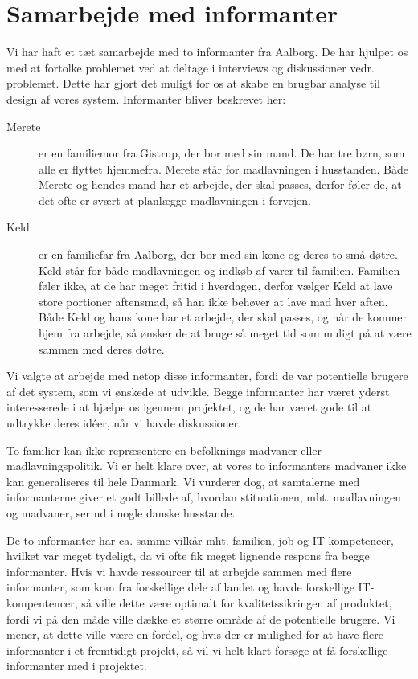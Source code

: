 \chapter{Samarbejde med informanter}
\label{akademiskinformanter}



Vi har haft et tæt samarbejde med to informanter fra Aalborg. De har hjulpet os med at fortolke problemet ved at deltage i interviews og diskussioner vedr. problemet. Dette har gjort det muligt for os at skabe en brugbar analyse til design af vores system. Informanter bliver beskrevet her:

\begin{description}
\item[Merete] er en familiemor fra Gistrup, der bor med sin mand. De har tre børn, som alle er flyttet hjemmefra. Merete står for madlavningen i husstanden. Både Merete og hendes mand har et arbejde, der skal passes, derfor føler de, at det ofte er svært at planlægge madlavningen i forvejen.

\item[Keld] er en familiefar fra Aalborg, der bor med sin kone og deres to små døtre. Keld står for både madlavningen og indkøb af varer til familien. Familien føler ikke, at de har meget fritid i hverdagen, derfor vælger Keld at lave store portioner aftensmad, så han ikke behøver at lave mad hver aften. Både Keld og hans kone har et arbejde, der skal passes, og når de kommer hjem fra arbejde, så ønsker de at bruge så meget tid som muligt på at være sammen med deres døtre.
\end{description}

Vi valgte at arbejde med netop disse informanter, fordi de var potentielle brugere af det system, som vi ønskede at udvikle. Begge informanter har været yderst interesserede i at hjælpe os igennem projektet, og de har været gode til at udtrykke deres idéer, når vi havde diskussioner.

To familier kan ikke repræsentere en befolknings madvaner eller madlavningspolitik. Vi er helt klare over, at vores to informanters madvaner ikke kan generaliseres til hele Danmark. Vi vurderer dog, at samtalerne med informanterne giver et godt billede af, hvordan stituationen, mht. madlavningen og madvaner, ser ud i nogle danske husstande. 

De to informanter har ca. samme vilkår mht. familien, job og IT-kompetencer, hvilket var meget tydeligt, da vi ofte fik meget lignende respons fra begge informanter. Hvis vi havde ressourcer til at arbejde sammen med flere informanter, som \fx kom fra forskellige dele af landet og havde forskellige IT-kompentencer, så ville dette være optimalt for kvalitetssikringen af produktet, fordi vi på den måde ville dække et større område af de potentielle brugere. Vi mener, at dette ville være en fordel, og hvis der er mulighed for at have flere informanter i et fremtidigt projekt, så vil vi helt klart forsøge at få forskellige informanter med i projektet.

